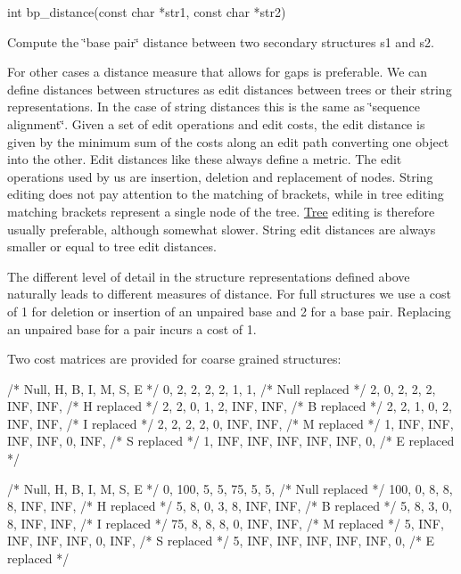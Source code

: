 \begin{DoxyVerb}int bp_distance(const char *str1,
                const char *str2)
\end{DoxyVerb}
 Compute the \char`\"{}base pair\char`\"{} distance between two secondary structures s1 and s2.

For other cases a distance measure that allows for gaps is preferable. We can define distances between structures as edit distances between trees or their string representations. In the case of string distances this is the same as \char`\"{}sequence alignment\char`\"{}. Given a set of edit operations and edit costs, the edit distance is given by the minimum sum of the costs along an edit path converting one object into the other. Edit distances like these always define a metric. The edit operations used by us are insertion, deletion and replacement of nodes. String editing does not pay attention to the matching of brackets, while in tree editing matching brackets represent a single node of the tree. \hyperlink{structTree}{Tree} editing is therefore usually preferable, although somewhat slower. String edit distances are always smaller or equal to tree edit distances.

The different level of detail in the structure representations defined above naturally leads to different measures of distance. For full structures we use a cost of 1 for deletion or insertion of an unpaired base and 2 for a base pair. Replacing an unpaired base for a pair incurs a cost of 1.

Two cost matrices are provided for coarse grained structures\-:

\begin{DoxyVerb}/*  Null,   H,   B,   I,   M,   S,   E    */
   {   0,   2,   2,   2,   2,   1,   1},   /* Null replaced */
   {   2,   0,   2,   2,   2, INF, INF},   /* H    replaced */
   {   2,   2,   0,   1,   2, INF, INF},   /* B    replaced */
   {   2,   2,   1,   0,   2, INF, INF},   /* I    replaced */
   {   2,   2,   2,   2,   0, INF, INF},   /* M    replaced */
   {   1, INF, INF, INF, INF,   0, INF},   /* S    replaced */
   {   1, INF, INF, INF, INF, INF,   0},   /* E    replaced */


/* Null,   H,   B,   I,   M,   S,   E   */
   {   0, 100,   5,   5,  75,   5,   5},   /* Null replaced */
   { 100,   0,   8,   8,   8, INF, INF},   /* H    replaced */
   {   5,   8,   0,   3,   8, INF, INF},   /* B    replaced */
   {   5,   8,   3,   0,   8, INF, INF},   /* I    replaced */
   {  75,   8,   8,   8,   0, INF, INF},   /* M    replaced */
   {   5, INF, INF, INF, INF,   0, INF},   /* S    replaced */
   {   5, INF, INF, INF, INF, INF,   0},   /* E    replaced */
\end{DoxyVerb}


